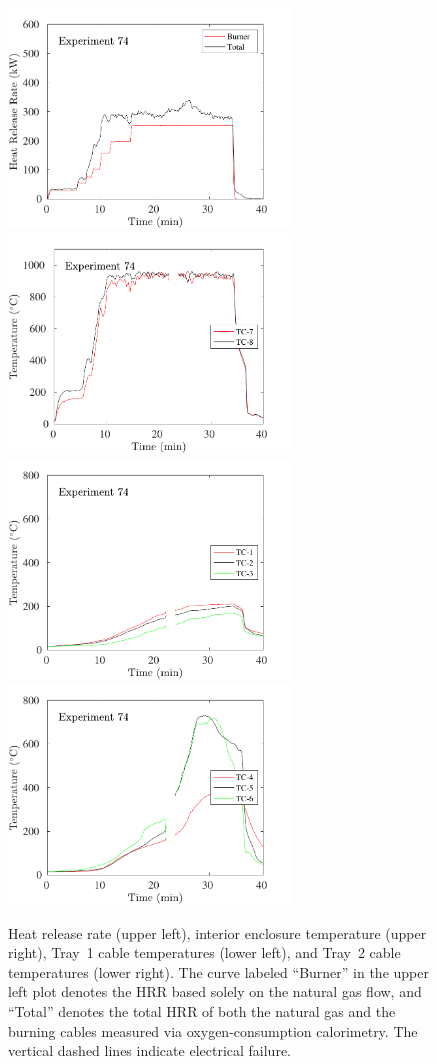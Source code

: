 \begin{figure}[H]
\includegraphics[height=2.30in]{../SCRIPT_FIGURES/Test_74_HRR} \hfill
\includegraphics[height=2.30in]{../SCRIPT_FIGURES/Test_74_TC_7-8} \\
\includegraphics[height=2.30in]{../SCRIPT_FIGURES/Test_74_TC_1-3} \hfill
\includegraphics[height=2.30in]{../SCRIPT_FIGURES/Test_74_TC_4-6}
\caption[HRR and temperatures of Experiment 74]{Heat release rate (upper left), interior enclosure temperature (upper right), Tray~1 cable temperatures (lower left), and Tray~2 cable temperatures (lower right). The curve labeled ``Burner'' in the upper left plot denotes the HRR based solely on the natural gas flow, and ``Total'' denotes the total HRR of both the natural gas and the burning cables measured via oxygen-consumption calorimetry. The vertical dashed lines indicate electrical failure.}
\label{fig:Test_74}
\end{figure}

